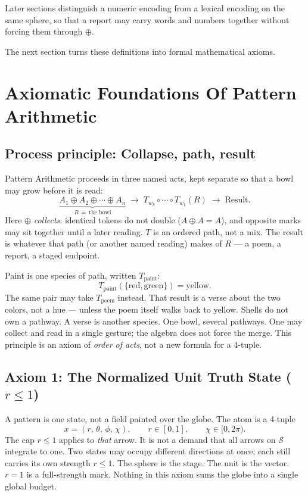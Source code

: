 \documentclass[12pt, a4paper]{article}
\begin{document}
Later sections distinguish a numeric encoding from a lexical encoding on the same sphere, so that a report may carry words and numbers together without forcing them through $\oplus$.

The next section turns these definitions into formal mathematical axioms.


\section{Axiomatic Foundations Of Pattern Arithmetic}

\subsection{Process principle: Collapse, path, result}
\label{subsec:process_principle}
Pattern Arithmetic proceeds in three named acts, kept separate so that a bowl may grow before it is read:
\begin{equation}
    \underbrace{A_1 \oplus A_2 \oplus \cdots \oplus A_n}_{R\ =\ \text{the bowl}}
    \;\longrightarrow\;
    T_{w_k}\circ \cdots \circ T_{w_1}(R)
    \;\longrightarrow\;
    \text{Result}.
    \label{eq:pipeline}
\end{equation}
Here $\oplus$ \emph{collects}: identical tokens do not double ($A \oplus A = A$), and opposite marks may sit together until a later reading. $T$ is an ordered path, not a mix. The result is whatever that path (or another named reading) makes of $R$ --- a poem, a report, a staged endpoint.

Paint is one species of path, written $T_{\mathrm{paint}}$:
\[
T_{\mathrm{paint}}(\{\mathrm{red},\mathrm{green}\}) = \mathrm{yellow}.
\]
The same pair may take $T_{\mathrm{poem}}$ instead. That result is a
verse about the two colors, not a hue --- unless the poem itself
walks back to yellow. Shells do not own a pathway. A verse is another
species. One bowl, several pathways. One may collect
and read in a single gesture; the algebra does not force the merge.
This principle is an axiom of \emph{order of acts}, not a new formula
for a 4-tuple.

\subsection{Axiom 1: The Normalized Unit Truth State ($r \le 1$)}
\label{subsec:axiom1}
A pattern is one state, not a field painted over the globe. The atom is a
4-tuple
\begin{equation}
    x = (r,\,\theta,\,\phi,\,\chi),
    \qquad
    r \in [0,1],
    \qquad
    \chi \in [0,2\pi).
    \label{eq:unit_truth}
\end{equation}
The cap $r \le 1$ applies to \emph{that} arrow. It is not a demand that
all arrows on $\mathcal{S}$ integrate to one. Two states may occupy
different directions at once; each still carries its own strength
$r\le 1$. The sphere is the stage. The unit is the vector.
$r=1$ is a full-strength mark. Nothing in this axiom sums the globe
into a single global budget.
\end{document}
